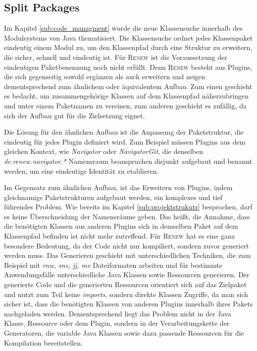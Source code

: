 	\subsection{Split Packages}
		Im Kapitel \ref{sub:code_managment}  wurde die neue Klassensuche innerhalb des Modulsystems von Java thematisiert. Die Klassensuche ordnet jedes Klassenpaket eindeutig einem Modul zu, um den Klassenpfad durch eine Struktur zu erweitern, die sicher, schnell und eindeutig ist. Für \textsc{Renew} ist die Voraussetzung der eindeutigen Paketbenennung noch nicht erfüllt. Denn \textsc{Renew} besteht aus Plugins, die sich gegenseitig sowohl ergänzen als auch erweitern und neigen dementsprechend zum ähnlichem oder äquivalentem Aufbau. Zum einen geschieht es bedacht, um zusammengehörige Klassen auf dem Klassenpfad näherzubringen und unter einem Paketnamen zu vereinen, zum anderen geschieht es zufällig, da sich der Aufbau gut für die Zielsetzung eignet.\bigbreak

		Die Lösung für den ähnlichen Aufbau ist die Anpassung der Paketstruktur, die eindeutig für jedes Plugin definiert wird. Zum Beispiel müssen Plugins aus dem gleichen Kontext, wie \textit{Navigator} oder \textit{NavigatorGit}, die denselben \textit{de.renew.navigator.*} Namensraum beanspruchen disjunkt aufgebaut und benannt werden, um eine eindeutige Identität zu etablieren. \bigbreak

		Im Gegensatz zum ähnlichen Aufbau, ist das Erweitern von Plugins, indem gleichnamige Paketstrukturen aufgebaut werden, ein komplexes und tief führendes Problem. Wie bereits im Kapitel \ref{sub:projektstrukutr} besprochen, darf es keine Überschneidung der Namensräume geben. Das heißt, die  Annahme, dass die benötigten Klassen aus anderen Plugins sich in demselben Paket auf dem Klassenpfad befinden ist nicht mehr zutreffend. \newline
		Für \textsc{Renew} hat es eine ganz besondere Bedeutung, da der Code nicht nur kompiliert, sondern zuvor generiert werden muss. Das Generieren geschieht mit unterschiedlichen Techniken, die zum Beispiel mit \textit{rnw, sns, jj, mv} Dateiformaten arbeiten und für bestimmte Anwendungsfälle unterschiedliche Java Klassen sowie Ressourcen generieren. \newline
		Der generierte Code und die generierten Ressourcen orientiert sich auf das Zielpaket und nutzt zum Teil keine \textit{imports}, sondern direkte Klassen Zugriffe, da man sich sicher ist, dass die benötigten Klassen von anderen Plugins innerhalb ihres Pakets nachgeladen werden. Dementsprechend liegt das Problem nicht in der Java Klasse, Ressource oder dem Plugin, sondern in der Verarbeitungskette der Generatoren, die variable Java Klassen sowie dazu passende Ressourcen für die Kompilation bereitstellen. \bigbreak

